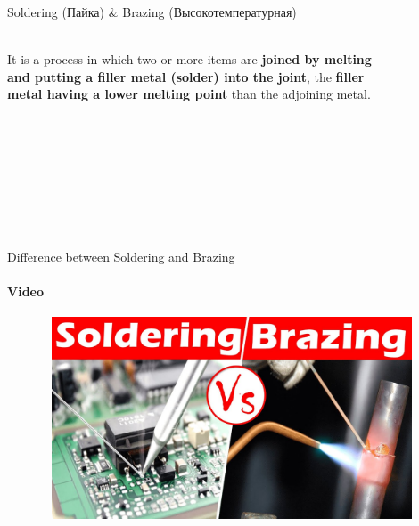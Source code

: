 \documentclass[aspectratio=169]{beamer}
\begin{document}
\begin{frame}[t]{Soldering (Пайка) \& Brazing (Высокотемпературная)}
    \framesubtitle{}
    \begin{columns}[T,onlytextwidth]
        \begin{column}{0.49\textwidth}
            It is a process in which two or more items are \textbf{joined by melting and putting a filler metal (solder) into the joint}, the \textbf{filler metal having a lower melting point} than the adjoining metal.
        \end{column}
        \begin{column}{0.49\textwidth}
            \begin{figure}[H]
                \centering\includegraphics[height=5cm,width=1\textwidth,keepaspectratio]{how_to_hold_solder.jpg}
                \label{fig:how_to_hold_solder.jpg}
            \end{figure}
        \end{column}
    \end{columns}
\end{frame}

\begin{frame}[t]{Difference between Soldering and Brazing}
    \framesubtitle{Video}
    \vspace{-0.6cm}
    \begin{figure}[H]
        \href{https://youtu.be/Rq_Vuye4HL0}{
            \centering\includegraphics[height=6cm,width=1\textwidth,keepaspectratio]{dif_sold_braz_video.jpg}}
        \label{fig:dif_sold_braz_video.jpg}
    \end{figure}
\end{frame}
\end{document}

